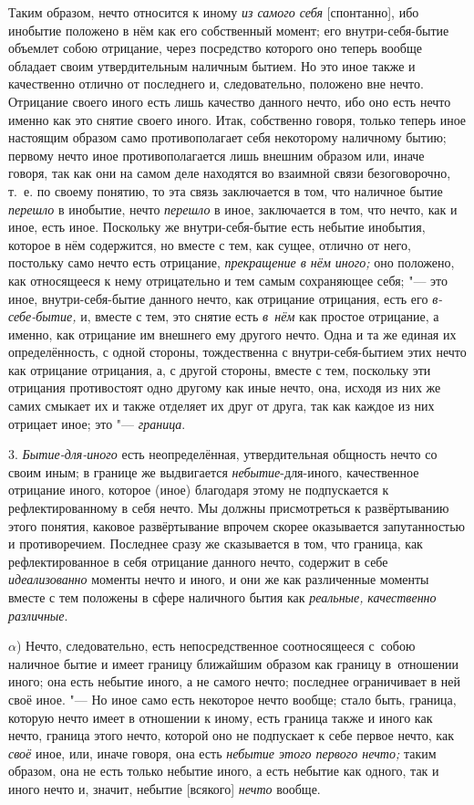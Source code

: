 Таким образом, нечто относится к иному {\em из самого
себя} [спонтанно], ибо инобытие положено в нём как его собственный
момент; его внутри-себя-бытие объемлет собою отрицание, через посредство
которого оно теперь вообще обладает своим утвердительным наличным бытием.
Но это иное также и качественно отлично от последнего и, следовательно,
положено вне нечто. Отрицание своего иного есть лишь качество данного
нечто, ибо оно есть нечто именно как это снятие своего иного. Итак,
собственно говоря, только теперь иное настоящим образом само
противополагает себя некоторому наличному бытию; первому нечто иное
противополагается лишь внешним образом или, иначе говоря, так как они на
самом деле находятся во взаимной связи безоговорочно, т.~е. по своему
понятию, то эта связь заключается в том, что наличное бытие
{\em перешло} в инобытие, нечто
{\em перешло} в иное, заключается в том, что нечто,
как и иное, есть иное. Поскольку же внутри-себя-бытие есть небытие
инобытия, которое в нём содержится, но вместе с тем, как сущее, отлично от
него, постольку само нечто есть отрицание,
{\em прекращение в нём иного;} оно
положено, как относящееся к нему отрицательно и тем самым сохраняющее себя;
"--- это иное, внутри-себя-бытие данного нечто, как отрицание отрицания,
есть его {\em в-себе-бытие,} и, вместе с тем, это
снятие есть {\em в~нём} как простое отрицание, а
именно, как отрицание им внешнего ему другого нечто. Одна и та же единая их
определённость, с одной стороны, тождественна с внутри-себя-бытием этих
нечто как отрицание отрицания, а, с другой стороны, вместе с тем, поскольку
эти отрицания противостоят одно другому как иные нечто, она,
исходя из них же самих смыкает их и также отделяет их друг от друга,
так как каждое из них отрицает иное; это "--- {\em граница}.

3. {\em Бытие-для-иного} есть неопределённая,
утвердительная общность нечто со своим иным; в границе же выдвигается
{\em небытие}-для-иного, качественное отрицание
иного, которое (иное) благодаря этому не подпускается к
рефлектированному в себя нечто. Мы должны присмотреться к развёртыванию
этого понятия, каковое развёртывание впрочем скорее оказывается
запутанностью и противоречием. Последнее сразу же сказывается в том, что
граница, как рефлектированное в себя отрицание данного нечто, содержит в
себе {\em идеализованно} моменты нечто и иного, и они
же как различенные моменты вместе с тем положены в сфере наличного бытия
как {\em реальные,}
{\em качественно различные}.

$\alpha$) Нечто, следовательно, есть непосредственное соотносящееся
с~собою наличное бытие и имеет границу ближайшим образом как границу
в~отношении иного; она есть небытие иного, а не самого нечто; последнее
ограничивает в ней своё иное. "--- Но иное само есть некоторое нечто вообще;
стало быть, граница, которую нечто имеет в отношении к иному, есть граница
также и иного как нечто, граница этого нечто, которой оно не подпускает к себе
первое нечто, как {\em своё} иное, или, иначе говоря, она есть
{\em небытие этого первого нечто;} таким образом, она не есть только небытие
иного, а есть небытие как одного, так и иного нечто и, значит, небытие
[всякого] {\em нечто} вообще.

